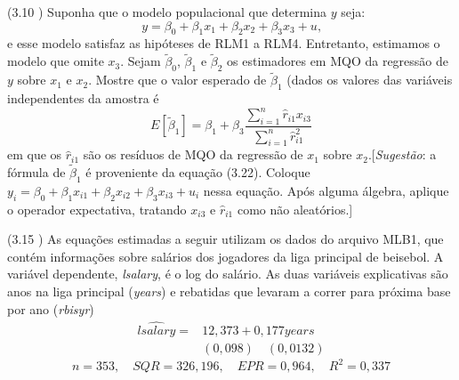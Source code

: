 \documentclass[12pt,letterpaper, onecolumn]{exam}
\begin{document}
\begin{questions}
    \question (3.10 \citep{wooldridge2010}) Suponha que o modelo populacional que determina $y$ seja: \begin{equation*}
        y = \beta_0 + \beta_1x_1 + \beta_2x_2 + \beta_3x_3 + u \text{,}
    \end{equation*} e esse modelo satisfaz as hipóteses de RLM1 a RLM4. Entretanto, estimamos o modelo que omite $x_3$. Sejam $\tilde\beta_0$, $\tilde\beta_1$ e $\tilde\beta_2$ os estimadores em MQO da regressão de $y$ sobre $x_1$ e $x_2$. Mostre que o valor esperado de $\tilde\beta_1$ (dados os valores das variáveis independentes da amostra é \begin{equation*}
        E[\tilde\beta_1] = \beta_1 + \beta_3\frac{\sum^n_{i=1}\hat r_{i1}x_{i3}}{\sum^n_{i=1}\hat r^2_{i1}}
    \end{equation*} em que os $\hat r_{i1}$ são os resíduos de MQO da regressão de $x_1$ sobre $x_2$.[\textit{Sugestão}: a fórmula de $\tilde\beta_1$ é proveniente da equação (3.22). Coloque $y_i = \beta_0 + \beta_1x_{i1} + \beta_2x_{i2}+\beta_3x_{i3} + u_i$ nessa equação. Após alguma álgebra, aplique o operador expectativa, tratando $x_{i3}$ e $\hat r_{i1}$ como não aleatórios.]
\
\
\


\question\qstar (3.15 \citep{wooldridge2016}) As equações estimadas a seguir utilizam os dados do arquivo MLB1, que contém informações sobre salários dos jogadores da liga principal de beisebol. A variável dependente, \textit{lsalary}, é o log do salário. As duas variáveis explicativas são anos na liga principal (\textit{years}) e rebatidas que levaram a correr para próxima base por ano (\textit{rbisyr})\begin{equation*}\begin{split}
        \widehat{lsalary} = &12,373 + 0,177 years\\
        \quad & (0,098) \quad(0,0132) \end{split}
\end{equation*}\begin{equation*}
    n = 353, \quad SQR = 326,196, \quad EPR = 0,964, \quad R^2 = 0,337
\end{equation*}



\end{questions}
\end{document}
